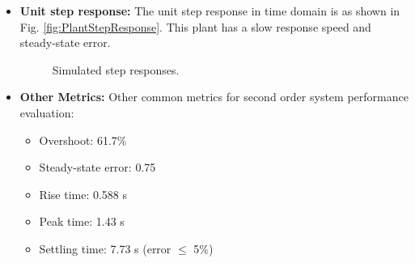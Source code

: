 \documentclass[12pt, oneside]{article}
\begin{document}
\begin{itemize}
    
    \item \textbf{Unit step response:} The unit step response in time domain is as shown in Fig. \ref{fig:PlantStepResponse}. This plant has a slow response speed and steady-state error.


        \begin{figure}[htbp]
          \centering
          \quad %
          \caption{Simulated step responses.}
        \end{figure}

    \item \textbf{Other Metrics:}  Other common metrics for second order system performance evaluation:
        \begin{itemize}
            \item Overshoot: 61.7\%
            \item Steady-state error: 0.75
            \item Rise time: 0.588 s
            \item Peak time: 1.43 s
            \item Settling time: 7.73 s (error $\leq$ 5\%)
        \end{itemize}
\end{itemize}
\end{document}
